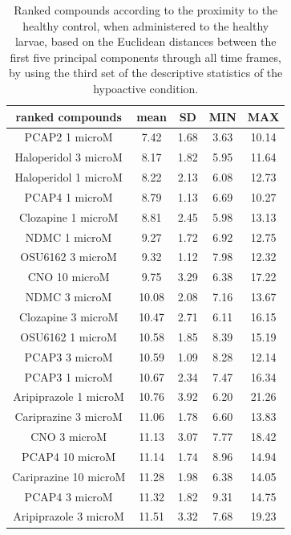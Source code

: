 \documentclass[a4paper,12pt]{article}
\begin{document}
\begin{table}[h!]\tiny
\centering
\caption{Ranked compounds according to the proximity to the healthy control, when administered to the healthy larvae, based on the Euclidean distances between the first five principal components through all time frames, by using the third set of the descriptive statistics of the hypoactive condition.}
\begin{tabular}{|c|c|c|c|c|}
\hline
ranked compounds             & mean & SD   & MIN  & MAX   \\ \hline
PCAP2 1 microM         & 7.42  & 1.68 & 3.63  & 10.14 \\ \hline
Haloperidol 3 microM   & 8.17  & 1.82 & 5.95  & 11.64 \\ \hline
Haloperidol 1 microM   & 8.22  & 2.13 & 6.08  & 12.73 \\ \hline
PCAP4 1 microM       & 8.79  & 1.13 & 6.69  & 10.27 \\ \hline
Clozapine 1 microM     & 8.81  & 2.45 & 5.98  & 13.13 \\ \hline
NDMC 1 microM          & 9.27  & 1.72 & 6.92  & 12.75 \\ \hline
OSU6162 3 microM       & 9.32  & 1.12 & 7.98  & 12.32 \\ \hline
CNO 10 microM          & 9.75  & 3.29 & 6.38  & 17.22 \\ \hline
NDMC 3 microM          & 10.08 & 2.08 & 7.16  & 13.67 \\ \hline
Clozapine 3 microM     & 10.47 & 2.71 & 6.11  & 16.15 \\ \hline
OSU6162 1 microM       & 10.58 & 1.85 & 8.39  & 15.19 \\ \hline
PCAP3 3 microM       & 10.59 & 1.09 & 8.28  & 12.14 \\ \hline
PCAP3 1 microM       & 10.67 & 2.34 & 7.47  & 16.34 \\ \hline
Aripiprazole 1 microM  & 10.76 & 3.92 & 6.20   & 21.26 \\ \hline
Cariprazine 3 microM   & 11.06 & 1.78 & 6.60   & 13.83 \\ \hline
CNO 3 microM           & 11.13 & 3.07 & 7.77  & 18.42 \\ \hline
PCAP4 10 microM      & 11.14 & 1.74 & 8.96  & 14.94 \\ \hline
Cariprazine 10 microM  & 11.28 & 1.98 & 6.38  & 14.05 \\ \hline
PCAP4 3 microM       & 11.32 & 1.82 & 9.31  & 14.75 \\ \hline
Aripiprazole 3 microM  & 11.51 & 3.32 & 7.68  & 19.23 \\ \hline

\end{tabular}
\end{table}
\end{document}
